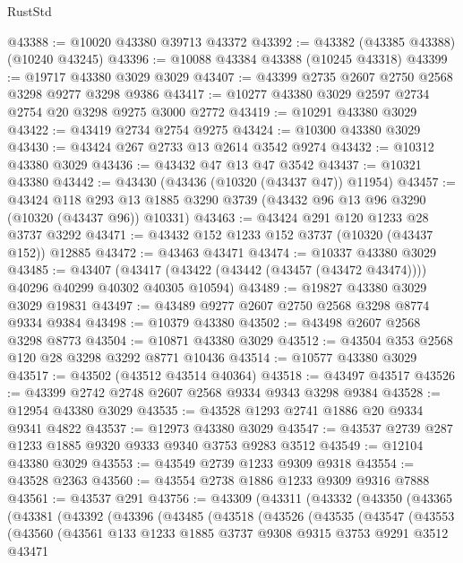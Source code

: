 \begin{lexlean}{RustStd}
\begin{coremodule}
@43388 := @10020 @43380 @39713 @43372
@43392 := @43382 (@43385 @43388) (@10240 @43245)
@43396 := @10088 @43384 @43388 (@10245 @43318)
@43399 := @19717 @43380 @3029 @3029
@43407 := @43399 @2735 @2607 @2750 @2568 @3298 @9277 @3298 @9386
@43417 := @10277 @43380 @3029 @2597 @2734 @2754 @20 @3298 @9275 @3000 @2772
@43419 := @10291 @43380 @3029
@43422 := @43419 @2734 @2754 @9275
@43424 := @10300 @43380 @3029
@43430 := @43424 @267 @2733 @13 @2614 @3542 @9274
@43432 := @10312 @43380 @3029
@43436 := @43432 @47 @13 @47 @3542
@43437 := @10321 @43380
@43442 := @43430 (@43436 (@10320 (@43437 @47)) @11954)
@43457 := @43424
    @118
    @293
    @13
    @1885
    @3290
    @3739
    (@43432 @96 @13 @96 @3290 (@10320 (@43437 @96)) @10331)
@43463 := @43424 @291 @120 @1233 @28 @3737 @3292
@43471 := @43432 @152 @1233 @152 @3737 (@10320 (@43437 @152)) @12885
@43472 := @43463 @43471
@43474 := @10337 @43380 @3029
@43485 := @43407
    (@43417 (@43422 (@43442 (@43457 (@43472 @43474)))) @40296 @40299 @40302 @40305 @10594)
@43489 := @19827 @43380 @3029 @3029 @19831
@43497 := @43489 @9277 @2607 @2750 @2568 @3298 @8774 @9334 @9384
@43498 := @10379 @43380
@43502 := @43498 @2607 @2568 @3298 @8773
@43504 := @10871 @43380 @3029
@43512 := @43504 @353 @2568 @120 @28 @3298 @3292 @8771 @10436
@43514 := @10577 @43380 @3029
@43517 := @43502 (@43512 @43514 @40364)
@43518 := @43497 @43517
@43526 := @43399 @2742 @2748 @2607 @2568 @9334 @9343 @3298 @9384
@43528 := @12954 @43380 @3029
@43535 := @43528 @1293 @2741 @1886 @20 @9334 @9341 @4822
@43537 := @12973 @43380 @3029
@43547 := @43537 @2739 @287 @1233 @1885 @9320 @9333 @9340 @3753 @9283 @3512
@43549 := @12104 @43380 @3029
@43553 := @43549 @2739 @1233 @9309 @9318
@43554 := @43528 @2363
@43560 := @43554 @2738 @1886 @1233 @9309 @9316 @7888
@43561 := @43537 @291
@43756 := @43309
    (@43311
      (@43332
        (@43350
          (@43365
            (@43381
              (@43392
                (@43396
                  (@43485
                    (@43518
                      (@43526
                        (@43535
                          (@43547
                            (@43553
                              (@43560
                                (@43561
                                  @133
                                  @1233
                                  @1885
                                  @3737
                                  @9308
                                  @9315
                                  @3753
                                  @9291
                                  @3512
                                  @43471

\end{coremodule}
\end{lexlean}
